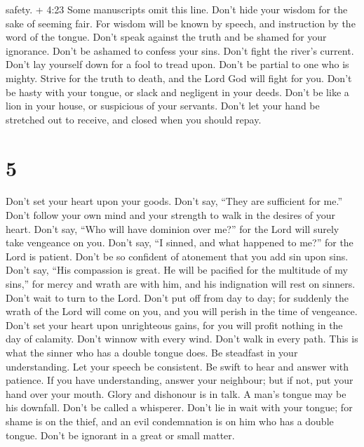 safety. + 4:23 Some manuscripts omit this line. Don't hide your wisdom
for the sake of seeming fair.  For wisdom will be known by
speech, and instruction by the word of the tongue.  Don't
speak against the truth and be shamed for your ignorance. 
Don't be ashamed to confess your sins. Don't fight the river's current.
 Don't lay yourself down for a fool to tread upon. Don't be
partial to one who is mighty.  Strive for the truth to
death, and the Lord God will fight for you.  Don't be hasty
with your tongue, or slack and negligent in your deeds. 
Don't be like a lion in your house, or suspicious of your servants.
 Don't let your hand be stretched out to receive, and
closed when you should repay.

\hypertarget{section-3}{%
\section{5}\label{section-3}}

 Don't set your heart upon your goods. Don't say, ``They are
sufficient for me.''  Don't follow your own mind and your
strength to walk in the desires of your heart.  Don't say,
``Who will have dominion over me?'' for the Lord will surely take
vengeance on you.  Don't say, ``I sinned, and what happened
to me?'' for the Lord is patient.  Don't be so confident of
atonement that you add sin upon sins.  Don't say, ``His
compassion is great. He will be pacified for the multitude of my sins,''
for mercy and wrath are with him, and his indignation will rest on
sinners.  Don't wait to turn to the Lord. Don't put off from
day to day; for suddenly the wrath of the Lord will come on you, and you
will perish in the time of vengeance.  Don't set your heart
upon unrighteous gains, for you will profit nothing in the day of
calamity.  Don't winnow with every wind. Don't walk in every
path. This is what the sinner who has a double tongue does.
 Be steadfast in your understanding. Let your speech be
consistent.  Be swift to hear and answer with patience.
 If you have understanding, answer your neighbour; but if
not, put your hand over your mouth.  Glory and dishonour is
in talk. A man's tongue may be his downfall.  Don't be
called a whisperer. Don't lie in wait with your tongue; for shame is on
the thief, and an evil condemnation is on him who has a double tongue.
 Don't be ignorant in a great or small matter.

